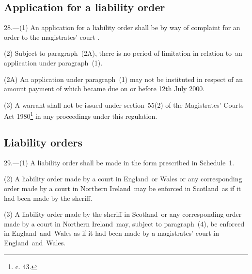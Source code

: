 \documentclass[12pt,a4paper]{article}
\begin{document}
\subsection[28. Application for a liability order]{Application for a liability order}

28.—(1) An application for a liability order shall be by way of complaint for an order to the magistrates' court%
.


(2) Subject to paragraph~(2A), there is no period of limitation in relation to~an application under paragraph~(1).

(2A) An application under paragraph~(1) may not be instituted in respect of an amount payment of which became due on or before 12th July 2000.

(3) A warrant shall not be issued under section~55(2) of the Magistrates' Courts Act 1980\footnote{ c. 43.} in any proceedings under this regulation.


\subsection[29. Liability orders]{Liability orders}

29.—(1) A liability order shall be made in the form prescribed in Schedule~1.

(2) A liability order made by a court in England~or Wales or any corresponding order made by a court in Northern Ireland~may be enforced in Scotland~as if it had been made by the sheriff.

(3) A liability order made by the sheriff in Scotland~or any corresponding order made by a court in Northern Ireland~may, subject to paragraph~(4), be enforced in England~and~Wales as if it had been made by a magistrates' court in England~and~Wales.
\end{document}
